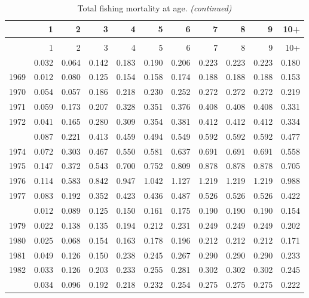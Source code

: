 \documentclass[
]{article}
\begin{document}
\begin{longtable}[t]{lrrrrrrrrrr}
\caption{\label{tab:FAA-tot-table}Total fishing mortality at age.}\\
\toprule
  & 1 & 2 & 3 & 4 & 5 & 6 & 7 & 8 & 9 & 10+\\
\midrule
\endfirsthead
\caption[]{Total fishing mortality at age. \textit{(continued)}}\\
\toprule
  & 1 & 2 & 3 & 4 & 5 & 6 & 7 & 8 & 9 & 10+\\
\midrule
\endhead

\endfoot
\bottomrule
\endlastfoot
1968 & 0.032 & 0.064 & 0.142 & 0.183 & 0.190 & 0.206 & 0.223 & 0.223 & 0.223 & 0.180\\
1969 & 0.012 & 0.080 & 0.125 & 0.154 & 0.158 & 0.174 & 0.188 & 0.188 & 0.188 & 0.153\\
1970 & 0.054 & 0.057 & 0.186 & 0.218 & 0.230 & 0.252 & 0.272 & 0.272 & 0.272 & 0.219\\
1971 & 0.059 & 0.173 & 0.207 & 0.328 & 0.351 & 0.376 & 0.408 & 0.408 & 0.408 & 0.331\\
1972 & 0.041 & 0.165 & 0.280 & 0.309 & 0.354 & 0.381 & 0.412 & 0.412 & 0.412 & 0.334\\
\addlinespace
1973 & 0.087 & 0.221 & 0.413 & 0.459 & 0.494 & 0.549 & 0.592 & 0.592 & 0.592 & 0.477\\
1974 & 0.072 & 0.303 & 0.467 & 0.550 & 0.581 & 0.637 & 0.691 & 0.691 & 0.691 & 0.558\\
1975 & 0.147 & 0.372 & 0.543 & 0.700 & 0.752 & 0.809 & 0.878 & 0.878 & 0.878 & 0.705\\
1976 & 0.114 & 0.583 & 0.842 & 0.947 & 1.042 & 1.127 & 1.219 & 1.219 & 1.219 & 0.988\\
1977 & 0.083 & 0.192 & 0.352 & 0.423 & 0.436 & 0.487 & 0.526 & 0.526 & 0.526 & 0.422\\
\addlinespace
1978 & 0.012 & 0.089 & 0.125 & 0.150 & 0.161 & 0.175 & 0.190 & 0.190 & 0.190 & 0.154\\
1979 & 0.022 & 0.138 & 0.135 & 0.194 & 0.212 & 0.231 & 0.249 & 0.249 & 0.249 & 0.202\\
1980 & 0.025 & 0.068 & 0.154 & 0.163 & 0.178 & 0.196 & 0.212 & 0.212 & 0.212 & 0.171\\
1981 & 0.049 & 0.126 & 0.150 & 0.238 & 0.245 & 0.267 & 0.290 & 0.290 & 0.290 & 0.233\\
1982 & 0.033 & 0.126 & 0.203 & 0.233 & 0.255 & 0.281 & 0.302 & 0.302 & 0.302 & 0.245\\
\addlinespace
1983 & 0.034 & 0.096 & 0.192 & 0.218 & 0.232 & 0.254 & 0.275 & 0.275 & 0.275 & 0.222\\

\end{longtable}
\end{document}

